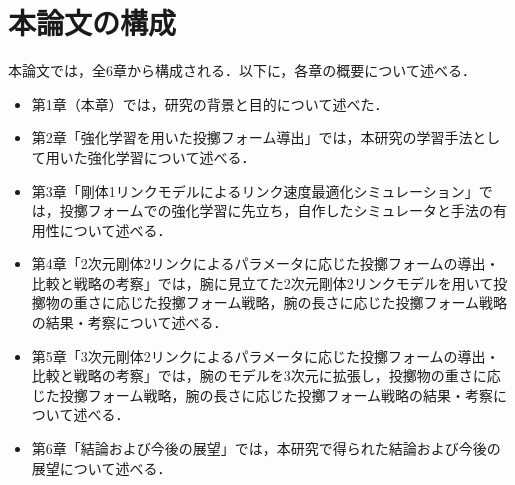         \section{本論文の構成}
        本論文では，全6章から構成される．以下に，各章の概要について述べる．
        \begin{itemize}
          \item 第1章（本章）では，研究の背景と目的について述べた．
          \item 第2章「強化学習を用いた投擲フォーム導出」では，本研究の学習手法として用いた強化学習について述べる．
          \item 第3章「剛体1リンクモデルによるリンク速度最適化シミュレーション」では，投擲フォームでの強化学習に先立ち，自作したシミュレータと手法の有用性について述べる．
          \item 第4章「2次元剛体2リンクによるパラメータに応じた投擲フォームの導出・比較と戦略の考察」では，腕に見立てた2次元剛体2リンクモデルを用いて投擲物の重さに応じた投擲フォーム戦略，腕の長さに応じた投擲フォーム戦略の結果・考察について述べる．
          \item 第5章「3次元剛体2リンクによるパラメータに応じた投擲フォームの導出・比較と戦略の考察」では，腕のモデルを3次元に拡張し，投擲物の重さに応じた投擲フォーム戦略，腕の長さに応じた投擲フォーム戦略の結果・考察について述べる．
          \item 第6章「結論および今後の展望」では，本研究で得られた結論および今後の展望について述べる．
        \end{itemize}
